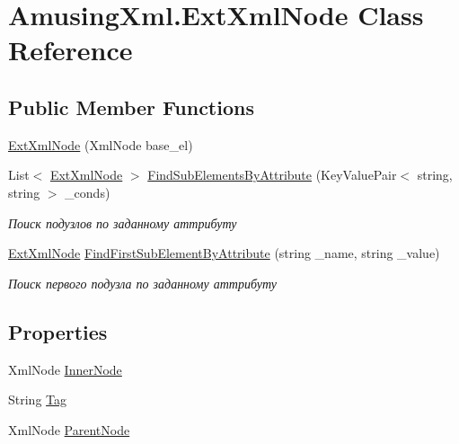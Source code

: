 \hypertarget{class_amusing_xml_1_1_ext_xml_node}{
\section{AmusingXml.ExtXmlNode Class Reference}
\label{class_amusing_xml_1_1_ext_xml_node}
}
\subsection*{Public Member Functions}
\begin{DoxyCompactItemize}
\item 
\hyperlink{class_amusing_xml_1_1_ext_xml_node_a001979fd3815be6df64f0034a98b6e17}{ExtXmlNode} (XmlNode base\_\-el)
\item 
List$<$ \hyperlink{class_amusing_xml_1_1_ext_xml_node}{ExtXmlNode} $>$ \hyperlink{class_amusing_xml_1_1_ext_xml_node_aaee3a908df760b224c3f6bc55432c19d}{FindSubElementsByAttribute} (KeyValuePair$<$ string, string $>$ \_\-conds)
\begin{DoxyCompactList}\small\item\em Поиск подузлов по заданному аттрибуту \item\end{DoxyCompactList}\item 
\hyperlink{class_amusing_xml_1_1_ext_xml_node}{ExtXmlNode} \hyperlink{class_amusing_xml_1_1_ext_xml_node_a7f816850a077750afba643e9666a83c4}{FindFirstSubElementByAttribute} (string \_\-name, string \_\-value)
\begin{DoxyCompactList}\small\item\em Поиск первого подузла по заданному аттрибуту \item\end{DoxyCompactList}\end{DoxyCompactItemize}
\subsection*{Properties}
\begin{DoxyCompactItemize}
\item 
XmlNode \hyperlink{class_amusing_xml_1_1_ext_xml_node_a4b14463a39170691895230af0c610985}{InnerNode}
\item 
String \hyperlink{class_amusing_xml_1_1_ext_xml_node_a9baf3d709ff4f089cd4813cd99c37b77}{Tag}
\item 
XmlNode \hyperlink{class_amusing_xml_1_1_ext_xml_node_a28fb4031a1802944860c53faa218645d}{ParentNode}
\end{DoxyCompactItemize}



